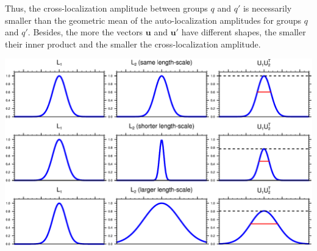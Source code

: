 \documentclass[12pt]{scrartcl}
\begin{document}
Thus, the cross-localization amplitude between groups $q$ and $q'$ is necessarily smaller than the geometric mean of the auto-localization amplitudes for groups $q$ and $q'$. Besides, the more the vectors $\mathbf{u}$ and $\mathbf{u}'$ have different shapes, the smaller their inner product and the smaller the cross-localization amplitude.
\begin{center}
\includegraphics[width=\linewidth]{convolution_exp.pdf}
\end{center}



\end{document}
